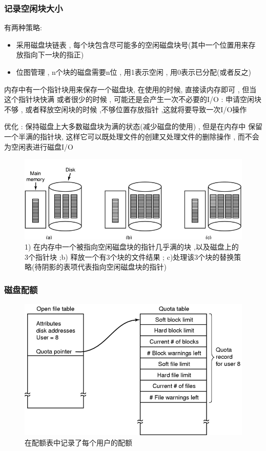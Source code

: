 \documentclass[UTF8,a4paper]{ctexart}
\begin{document}
\subsubsection{记录空闲块大小}
有两种策略:
\begin{itemize}
	\item 采用磁盘块链表 , 每个块包含尽可能多的空闲磁盘块号(其中一个位置用来存放指向下一块的指正)
	\item 位图管理 , n个块的磁盘需要n位 , 用1表示空闲 , 用0表示已分配(或者反之)
\end{itemize}


内存中有一个指针块用来保存一个磁盘块, 在使用的时候, 直接读内存即可 ,  但当这个指针块快满 或者很少的时候 , 可能还是会产生一次不必要的I/O  : 申请空闲块不够 , 或者释放空闲块的时候 ,不够位置存放指针 ,这就将要导致一次I/O操作

优化 : 保持磁盘上大多数磁盘块为满的状态(减少磁盘的使用) , 但是在内存中 保留一个半满的指针块, 这样它可以既处理文件的创建又处理文件的删除操作 , 而不会为空闲表进行磁盘I/O

\begin{figure}[H]
	\centering
	\includegraphics[scale = 0.5]{assets/ModernOperatingSystems/2018-01-08-19-00-19.png}
	\caption{1) 在内存中一个被指向空闲磁盘块的指针几乎满的块 ,以及磁盘上的3个指针块  ;b) 释放一个有3个块的文件结果 ; c)处理该3个块的替换策略(待阴影的表项代表指向空闲磁盘块的指针)}
\end{figure}

\subsubsection{磁盘配额}
\begin{figure}[H]
	\centering
	\includegraphics[scale = 0.5]{assets/ModernOperatingSystems/2018-01-08-19-02-57.png}
	\caption{在配额表中记录了每个用户的配额}
\end{figure}
\end{document}
